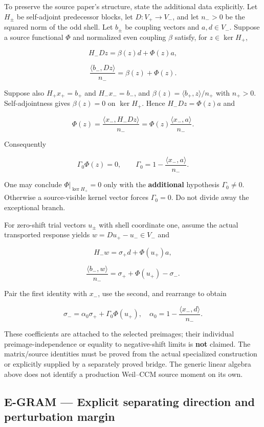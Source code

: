 \documentclass[
  11pt,
  a4paper,
]{article}
\begin{document}
To preserve the source paper's structure, state the additional data
explicitly. Let \(H_\pm\) be self-adjoint predecessor blocks, let
\(D:V_+\to V_-\), and let \(n_->0\) be the squared norm of the odd
shell. Let \(b_\pm\) be coupling vectors and \(a,d\in V_-\). Suppose a
source functional \(\Phi\) and normalized even coupling \(\beta\)
satisfy, for \(z\in\ker H_+\),

\[H_-Dz=\beta(z)d+\Phi(z)a,\]

\[\frac{\langle b_-,Dz\rangle}{n_-}=\beta(z)+\Phi(z).\]

Suppose also \(H_+x_+=b_+\) and \(H_-x_-=b_-\), and
\(\beta(z)=\langle b_+,z\rangle/n_+\) with \(n_+>0\). Self-adjointness
gives \(\beta(z)=0\) on \(\ker H_+\). Hence \(H_-Dz=\Phi(z)a\) and

\[\Phi(z)=\frac{\langle x_-,H_-Dz\rangle}{n_-}
=\Phi(z)\frac{\langle x_-,a\rangle}{n_-}.\]

Consequently

\[\boxed{\Gamma_0\Phi(z)=0,\qquad
\Gamma_0=1-\frac{\langle x_-,a\rangle}{n_-}.}\]

One may conclude \(\Phi|_{\ker H_+}=0\) only with the
\textbf{additional} hypothesis \(\Gamma_0\ne0\). Otherwise a
source-visible kernel vector forces \(\Gamma_0=0\). Do not divide away
the exceptional branch.

For zero-shift trial vectors \(u_\pm\) with shell coordinate one, assume
the actual transported response yields \(w=Du_+-u_-\in V_-\) and

\[H_-w=\sigma_+d+\Phi(u_+)a,\]

\[\frac{\langle b_-,w\rangle}{n_-}
=\sigma_++\Phi(u_+)-\sigma_-.\]

Pair the first identity with \(x_-\), use the second, and rearrange to
obtain

\[\sigma_-=\alpha_0\sigma_++\Gamma_0\Phi(u_+),
\quad\alpha_0=1-\frac{\langle x_-,d\rangle}{n_-}.\]

These coefficients are attached to the selected preimages; their
individual preimage-independence or equality to negative-shift limits is
\textbf{not} claimed. The matrix/source identities must be proved from
the actual specialized construction or explicitly supplied by a
separately proved bridge. The generic linear algebra above does not
identify a production Weil--CCM source moment on its own.

\subsection{E-GRAM --- Explicit separating direction and perturbation
margin}\label{e-gram-explicit-separating-direction-and-perturbation-margin}
\end{document}
